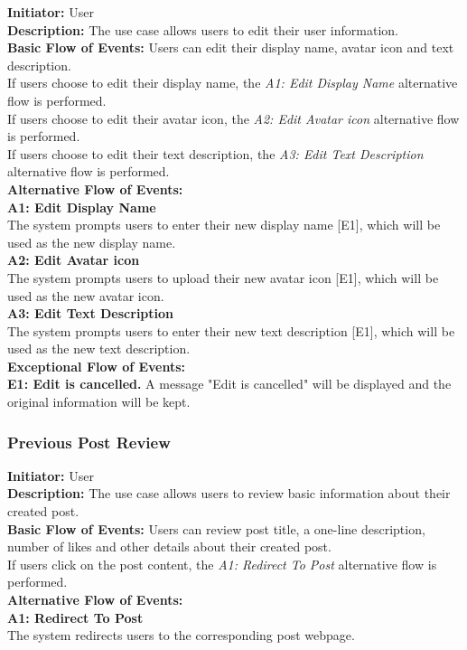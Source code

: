 \documentclass[11pt, a4paper]{article}
\begin{document}
\begin{figure}[H]
    \centering
    
\end{figure}

\textbf{Initiator: }User\\
\textbf{Description: }The use case allows users to edit their user information.\\
\textbf{Basic Flow of Events: }Users can edit their display name, avatar icon and text description.\\
If users choose to edit their display name, the \textit{A1: Edit Display Name} alternative flow is performed.\\
If users choose to edit their avatar icon, the \textit{A2: Edit Avatar icon} alternative flow is performed.\\
If users choose to edit their text description, the \textit{A3: Edit Text Description} alternative flow is performed.\\
\textbf{Alternative Flow of Events: }\\
\textbf{A1: Edit Display Name}\\
The system prompts users to enter their new display name [E1], which will be used as the new display name.\\
\textbf{A2: Edit Avatar icon}\\
The system prompts users to upload their new avatar icon [E1], which will be used as the new avatar icon.\\
\textbf{A3: Edit Text Description}\\
The system prompts users to enter their new text description [E1], which will be used as the new text description.\\
\textbf{ Exceptional Flow of Events:}\\
\textbf{E1: Edit is cancelled.} A message "Edit is cancelled" will be displayed and the original information will be kept.\\

\subsubsection{Previous Post Review}

\begin{figure}[H]
    \centering
    
\end{figure}

\textbf{Initiator: }User\\
\textbf{Description: }The use case allows users to review basic information about their created post.\\
\textbf{Basic Flow of Events: }Users can review post title, a one-line description, number of likes and other details about their created post. \\
If users click on the post content, the \textit{A1: Redirect To Post} alternative flow is performed.\\
\textbf{Alternative Flow of Events: }\\
\textbf{A1: Redirect To Post}\\
The system redirects users to the corresponding post webpage.
\end{document}
